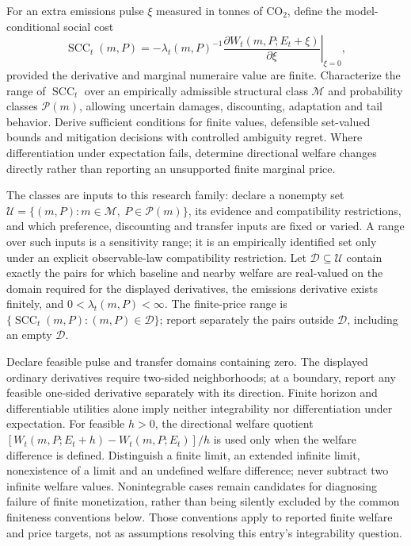 \documentclass[11pt,a4paper]{article}
\begin{document}
For an extra emissions pulse $\xi$ measured in tonnes of $\mathrm{CO}_2$, define the model-conditional social cost
\[
\operatorname{SCC}_t(m,P)=
-\lambda_t(m,P)^{-1}
\left.\frac{\partial W_t(m,P;E_t+\xi)}{\partial\xi}\right|_{\xi=0},
\]
provided the derivative and marginal numeraire value are finite. Characterize the range of $\operatorname{SCC}_t$ over an empirically admissible structural class $\mathcal M$ and probability classes $\mathcal P(m)$, allowing uncertain damages, discounting, adaptation and tail behavior. Derive sufficient conditions for finite values, defensible set-valued bounds and mitigation decisions with controlled ambiguity regret. Where differentiation under expectation fails, determine directional welfare changes directly rather than reporting an unsupported finite marginal price.

The classes are inputs to this research family: declare a nonempty set $\mathcal U=\{(m,P):m\in\mathcal M,\ P\in\mathcal P(m)\}$, its evidence and compatibility restrictions, and which preference, discounting and transfer inputs are fixed or varied. A range over such inputs is a sensitivity range; it is an empirically identified set only under an explicit observable-law compatibility restriction. Let $\mathcal D\subseteq\mathcal U$ contain exactly the pairs for which baseline and nearby welfare are real-valued on the domain required for the displayed derivatives, the emissions derivative exists finitely, and $0<\lambda_t(m,P)<\infty$. The finite-price range is $\{\operatorname{SCC}_t(m,P):(m,P)\in\mathcal D\}$; report separately the pairs outside $\mathcal D$, including an empty $\mathcal D$.

Declare feasible pulse and transfer domains containing zero. The displayed ordinary derivatives require two-sided neighborhoods; at a boundary, report any feasible one-sided derivative separately with its direction. Finite horizon and differentiable utilities alone imply neither integrability nor differentiation under expectation. For feasible $h>0$, the directional welfare quotient $[W_t(m,P;E_t+h)-W_t(m,P;E_t)]/h$ is used only when the welfare difference is defined. Distinguish a finite limit, an extended infinite limit, nonexistence of a limit and an undefined welfare difference; never subtract two infinite welfare values. Nonintegrable cases remain candidates for diagnosing failure of finite monetization, rather than being silently excluded by the common finiteness conventions below. Those conventions apply to reported finite welfare and price targets, not as assumptions resolving this entry's integrability question.
\end{document}
